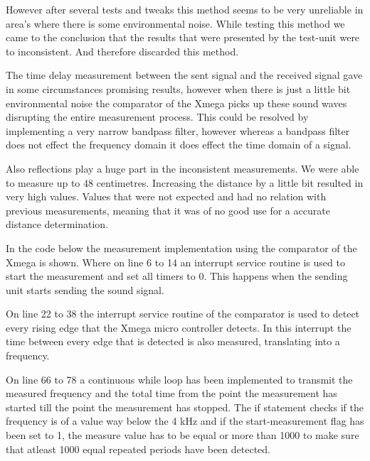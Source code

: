 \documentclass[10pt,a4paper]{article}
\begin{document}
However after several tests and tweaks this method seems to be very unreliable in area's where there is some environmental noise. While testing this method we came to the conclusion that the results that were presented by the test-unit were to inconsistent. And therefore discarded this method.

The time delay measurement between the sent signal and the received signal gave in some circumstances promising results, however when there is just a little bit environmental noise the comparator of the Xmega picks up these sound waves disrupting the entire measurement process. This could be resolved by implementing a very narrow bandpass filter, however whereas a bandpass filter does not effect the frequency domain it does effect the time domain of a signal.

Also reflections play a huge part in the inconsistent measurements. We were able to measure up to 48 centimetres. Increasing the distance by a little bit resulted in very high values. Values that were not expected and had no relation with previous measurements, meaning that it was of no good use for a accurate distance determination.

In the code below the measurement implementation using the comparator of the Xmega is shown. Where on line 6 to 14 an interrupt service routine is used to start the measurement and set all timers to 0. This happens when the sending unit starts sending the sound signal.

On line 22 to 38 the interrupt service routine of the comparator is used to detect every rising edge that the Xmega micro controller detects. In this interrupt the time between every edge that is detected is also measured, translating into a frequency.

On line 66 to 78 a continuous while loop has been implemented to transmit the measured frequency and the total time from the point the measurement has started till the point the measurement has stopped. The if statement checks if the frequency is of a value way below the 4 kHz and if the start-measurement flag has been set to 1, the measure value has to be equal or more than 1000 to make sure that atleast 1000 equal repeated periods have been detected.
\\\\


\end{document}
